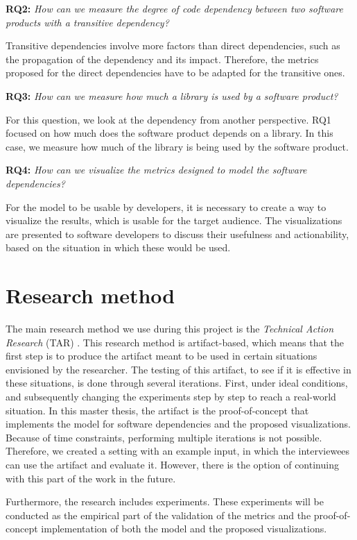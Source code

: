 \blankl
\textbf{RQ2:} \textit{How can we measure the degree of code dependency between two software products with a transitive dependency?}

\blankls
Transitive dependencies involve more factors than direct dependencies, such as the propagation of the dependency and its impact. Therefore, the metrics proposed for the direct dependencies have to be adapted for the transitive ones.

\blankl
\textbf{RQ3:} \textit{How can we measure how much a library is used by a software product?}

\blankls
For this question, we look at the dependency from another perspective. RQ1 focused on how much does the software product depends on a library. In this case, we measure how much of the library is being used by the software product.

\blankl
\textbf{RQ4:} \textit{How can we visualize the metrics designed to model the software dependencies?}

\blankls
For the model to be usable by developers, it is necessary to create a way to visualize the results, which is usable for the target audience. The visualizations are presented to software developers to discuss their usefulness and actionability, based on the situation in which these would be used.

\section{Research method}
The main research method we use during this project is the \textit{Technical Action Research} (TAR) \cite{wieringa2012technical}.
This research method is artifact-based, which means that the first step is to produce the artifact meant to be used in certain situations envisioned by the researcher. The testing of this artifact, to see if it is effective in these situations, is done through several iterations. First, under ideal conditions, and subsequently changing the experiments step by step to reach a real-world situation. In this master thesis, the artifact is the proof-of-concept that implements the model for software dependencies and the proposed visualizations. Because of time constraints, performing multiple iterations is not possible. Therefore, we created a setting with an example input, in which the interviewees can use the artifact and evaluate it. However, there is the option of continuing with this part of the work in the future.

\blankl
Furthermore, the research includes experiments. These experiments will be conducted as the empirical part of the validation of the metrics and the proof-of-concept implementation of both the model and the proposed visualizations.

